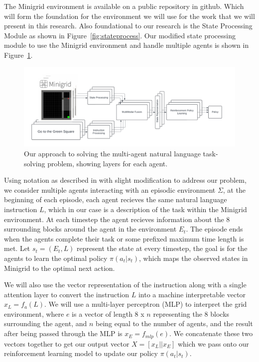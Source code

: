 \documentclass[11pt]{article}
\begin{document}
The Minigrid environment is available on a public repository in github. Which will form the foundation for the environment we will use for the work that we will present in this research. Also foundational to our research is the State Processing Module as shown in Figure~\ref{fig:stateprocess}. Our modified state processing module to use the Minigrid environment and handle multiple agents is shown in Figure~\ref{fig:modeloverview}.

\begin{figure}[!t]
  \centering
  \includegraphics[width=\linewidth]{figs/modeloverviewactual.pdf}
  \caption{Our approach to solving the multi-agent natural language task-solving problem, showing layers for each agent.}
  \label{fig:modeloverview}
\end{figure}

Using notation as described in \cite{Chaplot2017} with slight modification to address our problem, we consider multiple agents interacting with an episodic environment $\Sigma$, at the beginning of each episode, each agent recieves the same natural language instruction $L$, which in our case is a description of the task within the Minigrid environment. At each timestep the agent recieves information about the 8 surrounding blocks around the agent in the environment $E_t$. The episode ends when the agents complete their task or some prefixed maximum time length is met. Let $s_t = (E_t, L)$ represent the state at every timestep, the goal is for the agents to learn the optimal policy $\pi(a_t|s_t)$, which maps the observed states in Minigrid to the optimal next action. 

We will also use the vector representation of the instruction along with a single attention layer to convert the instruction $L$ into a machine interpretable vector $x_L = f_a(L)$. We will use a multi-layer perceptron (MLP) to interpret the grid environment, where $e$ is a vector of length 8 x $n$ representing the 8 blocks surrounding the agent, and $n$ being equal to the number of agents, and the result after being passed through the MLP is $x_E = f_{mlp}(e)$. We concatenate these two vectors together to get our output vector $X = [x_L||x_E]$ which we pass onto our reinforcement learning model to update our policy $\pi(a_t|s_t)$.
\end{document}
